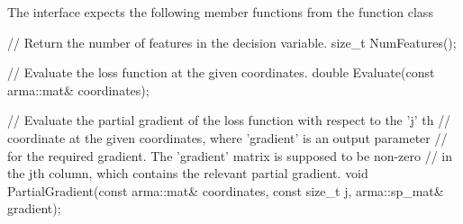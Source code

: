 The interface expects the following member functions from the function class


\begin{DoxyCode}
\textcolor{comment}{// Return the number of features in the decision variable.}
\textcolor{keywordtype}{size\_t} NumFeatures();
\end{DoxyCode}



\begin{DoxyCode}
\textcolor{comment}{// Evaluate the loss function at the given coordinates.}
\textcolor{keywordtype}{double} Evaluate(\textcolor{keyword}{const} arma::mat& coordinates);
\end{DoxyCode}



\begin{DoxyCode}
\textcolor{comment}{// Evaluate the partial gradient of the loss function with respect to the 'j' th}
\textcolor{comment}{// coordinate at the given coordinates, where 'gradient' is an output parameter}
\textcolor{comment}{// for the required gradient. The 'gradient' matrix is supposed to be non-zero}
\textcolor{comment}{// in the jth column, which contains the relevant partial gradient.}
\textcolor{keywordtype}{void} PartialGradient(\textcolor{keyword}{const} arma::mat& coordinates, \textcolor{keyword}{const} \textcolor{keywordtype}{size\_t} j, arma::sp\_mat& gradient);
\end{DoxyCode}
 